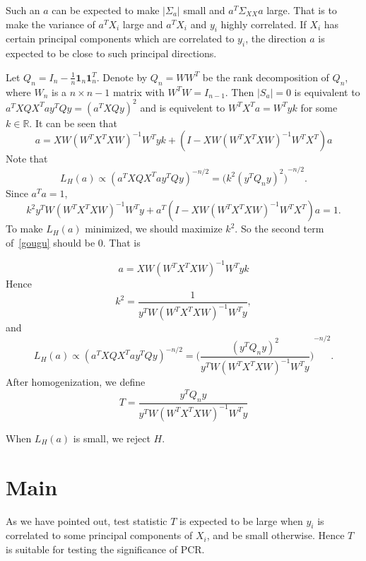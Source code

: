 \documentclass[review]{elsarticle}
\theoremstyle{plain}
\theoremstyle{definition}
\theoremstyle{remark}
\begin{document}
    Such an $a$ can be expected to make $|\Sigma_a|$ small and $a^T \Sigma_{XX} a$ large. That is to make the variance of $a^T X_i$ large and $a^T X_i$ and $y_i$ highly correlated. If $X_i$ has certain principal components which are correlated to $y_i$, the direction $a$ is expected to be close to such principal directions.


    Let $Q_n=I_n-\frac{1}{n}\textbf{1}_n\textbf{1}_n^T$. Denote by $Q_n=WW^T$ be the rank decomposition of $Q_n$, where $W_n$ is a $n\times n-1$ matrix with $W^T W=I_{n-1}$. 
    Then $|S_a|=0$ is equivalent to $a^T X Q X^T a y^T Q y={(a^T X Q y)}^2$ and is equivelent to $W^T X^T a=W^T y k$ for some $k\in \mathbb{R}$. It can be seen that
    \begin{equation}
        a=XW{(W^T X^T X W)}^{-1} W^T y k + (I-XW{(W^T X^T X W)}^{-1}W^T X^T)a
    \end{equation}
Note that 
    \begin{equation}
        L_H (a)\propto {(a^T X Q X^T a y^T Q y)}^{-n/2}={\big(k^2{(y^T Q_n y)}^2\big)}^{-n/2}.
    \end{equation}
Since $a^T a=1$,
    \begin{equation}\label{gougu}
        k^2 y^T W{(W^T X^T X W)}^{-1} W^T y + a^T(I-XW{(W^T X^T X W)}^{-1}W^T X^T)a=1.
    \end{equation}
    To make $L_H(a)$ minimized, we should maximize $k^2$. So the second term of~\ref{gougu} should be $0$. That is

    \begin{equation}
        a=XW{(W^T X^T X W)}^{-1} W^T y k 
    \end{equation}
    Hence 
    \begin{equation}
        k^2=\frac{1}{y^T W{(W^T X^T X W)}^{-1} W^T y},
    \end{equation}
    and 
    \begin{equation}
        L_H (a)\propto {(a^T X Q X^T a y^T Q y)}^{-n/2}={\Big(\frac{{(y^T Q_n y)}^2}{y^T W{(W^T X^T X W)}^{-1} W^T y}\Big)}^{-n/2}.
    \end{equation}
After homogenization, we define
\[
    T=\frac{y^T Q_n y}{
        y^T W{(W^T X^T X W)}^{-1}W^T y
    } 
    \]


    When $L_H(a)$ is small, we reject $H$.
\section{Main}

As we have pointed out, test statistic $T$ is expected to be large when $y_i$ is correlated to some principal components of $X_i$, and be small otherwise. Hence $T$ is suitable for testing the significance of PCR.\@
\end{document}
